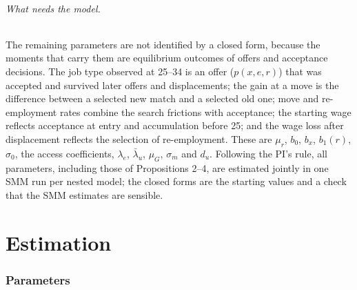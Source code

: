 \documentclass[11pt]{article}
\newcommand{\1}{\mathbf{1}}
\begin{document}
\paragraph{What needs the model.} The remaining parameters are not identified by a closed form, because the moments that
carry them are equilibrium outcomes of offers and acceptance decisions. The job type observed at 25--34 is an offer
($p(x, e, r)$) that was accepted and survived later offers and displacements; the gain at a move is the difference
between a selected new match and a selected old one; move and re-employment rates combine the search frictions with
acceptance; the starting wage reflects acceptance at entry and accumulation before 25; and the wage loss after
displacement reflects the selection of re-employment. These are $\mu_r$, $b_0$, $b_x$, $b_1(r)$, $\sigma_0$, the access
coefficients, $\lambda_e$, $\bar\lambda_u$, $\mu_G$, $\sigma_m$ and $d_u$. Following the PI's rule, all parameters,
including those of Propositions 2--4, are estimated jointly in one SMM run per nested model; the closed forms are the
starting values and a check that the SMM estimates are sensible.

\part{Estimation}

\section{Parameters}\label{sec:params}
\end{document}
